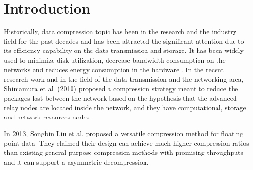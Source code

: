 \documentclass[sigconf]{acmart}
\begin{document}





\maketitle

\section{Introduction}
Historically, data compression \cite{lelewer1987data} topic has been in the research and the industry field for the past decades and has been attracted the significant attention due to its efficiency capability on the data transmission and storage. It has been widely used to minimize disk utilization, decrease bandwidth consumption on the networks and reduces energy consumption in the hardware \cite{welton2011improving}.
In the recent research work and in the field of the data transmission and the networking area, Shimamura et al. (2010) proposed a compression strategy meant to reduce the packages lost between the network based on the hypothesis that the advanced relay nodes are located inside the network, and they have computational, storage and network resources nodes\cite{shimamura2010compressing}. 

In 2013,  Songbin Liu et al. proposed a versatile compression method for floating point data. They claimed their design can achieve much higher compression ratios than existing general purpose compression methods with promising throughputs and it can support a asymmetric decompression. \cite{liu2013versatile} 
\end{document}
